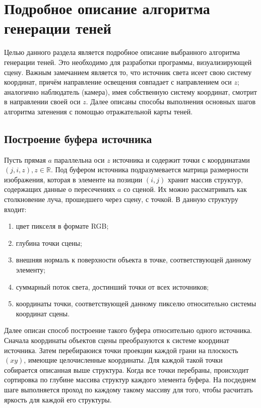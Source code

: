 \section{Подробное описание алгоритма генерации теней} {
    Целью данного раздела является
    подробное описание выбранного алгоритма генерации теней.
    Это необходимо для разработки программы, визуализирующей сцену.
    Важным замечанием является то, что источник света исеет свою систему координат,
    причём направление освещения совпадает с направлением оси $z$;
    аналогично наблюдатель (камера), имея собственную систему координат,
    смотрит в направлении своей оси $z$.
    Далее описаны способы выполнения основных шагов алгоритма
    затенения с помощью отражательной карты теней.
    \subsection{Построение буфера источника} {
        Пусть прямая $a$ параллельна оси $z$ источника и содержит
        точки с координатами $(j, i, z), z \in \mathbb{R}$.
        Под буфером источника подразумевается матрица размерности изображения, которая
        в элементе на позиции $(i, j)$ хранит массив структур, содержащих данные о
        пересечениях $a$ со сценой.
        Их можно рассматривать как столкновение луча, прошедшего через сцену, с точкой.
        В данную структуру входит:
        \begin{enumerate}
            \item цвет пикселя в формате RGB;
            \item глубина точки сцены;
            \item внешняя нормаль к поверхности объекта в точке,
            соответствующей данному элементу;
            \item суммарный поток света, достинший точки от всех источников;
            \item координаты точки, соответствующей данному пикселю относительно
            системы координат сцены.
        \end{enumerate}
        Далее описан способ построение такого буфера относительно одного источника.
        Сначала координаты объектов сцены преобразуются к системе координат источника.
        Затем перебираюися точки проекции каждой грани на плоскость $(xy)$,
        имеющие целочисленные координаты.
        Для каждой такой точки собирается описанная выше структура.
        Когда все точки перебраны, происходит сортировка по глубине массива
        структур каждого элемента буфера.
        На посдеднем шаге выполняется проход по каждому такому массиву для того, чтобы
        расчитать яркость для каждой его структуры.
    }
}
